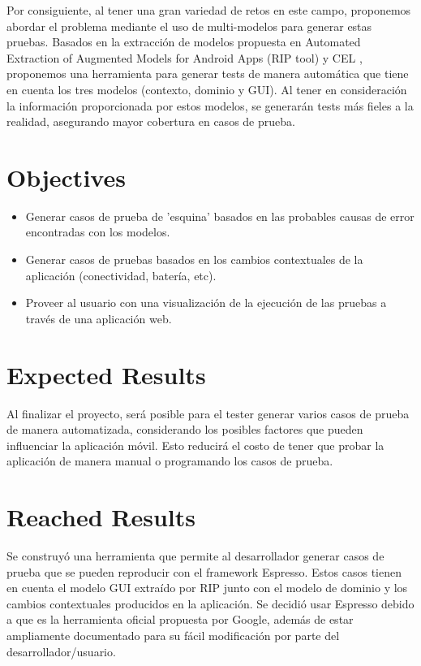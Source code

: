 Por consiguiente, al tener una gran variedad de retos en este campo, proponemos abordar el problema mediante el uso de multi-modelos para generar estas pruebas. Basados en la extracción de modelos propuesta en Automated Extraction of Augmented Models for Android Apps (RIP tool) \cite{LinanAutomatedApps} y CEL \cite{Linares-Vasquez2017ContinuousTesting}, proponemos una herramienta para generar tests de manera automática que tiene en cuenta los tres modelos (contexto, dominio y GUI). Al tener en consideración la información proporcionada por estos modelos, se generarán tests más fieles a la realidad, asegurando mayor cobertura en casos de prueba.

\section{Objectives}

\begin{itemize}
	\item Generar casos de prueba de 'esquina' basados en las probables causas de error encontradas con los modelos.
	\item Generar casos de pruebas basados en los cambios contextuales de la aplicación (conectividad, batería, etc).
	\item Proveer al usuario con una visualización de la ejecución de las pruebas a través de una aplicación web.
\end{itemize}

\section{Expected Results}
Al finalizar el proyecto, será posible para el tester generar varios casos de prueba de manera automatizada, considerando los posibles factores que pueden influenciar la aplicación móvil. Esto reducirá el costo de tener que probar la aplicación de manera manual o programando los casos de prueba.
\section{Reached Results}
Se construyó una herramienta que permite al desarrollador generar casos de prueba que se pueden reproducir con el framework Espresso. Estos casos tienen en cuenta el modelo GUI extraído por RIP junto con el modelo de dominio y los cambios contextuales producidos en la aplicación. Se decidió usar Espresso debido a que es la herramienta oficial propuesta por Google, además de estar ampliamente documentado para su fácil modificación por parte del desarrollador/usuario.
